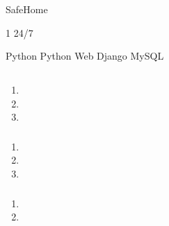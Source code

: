 \important{}

SafeHome

\important{}

1 24/7

\important{}

Python Python Web Django MySQL

\important{}

\important{}

\hypertarget{section-10}{%
\subsection{}\label{section-10}}

\hypertarget{section-11}{%
\subsubsection{}\label{section-11}}

\begin{enumerate}
\def\labelenumi{\arabic{enumi}.}
\tightlist
\item
\item
\item
\end{enumerate}

\hypertarget{section-12}{%
\subsubsection{}\label{section-12}}

\begin{enumerate}
\def\labelenumi{\arabic{enumi}.}
\tightlist
\item
\item
\item
\end{enumerate}

\hypertarget{section-13}{%
\subsubsection{}\label{section-13}}

\begin{enumerate}
\def\labelenumi{\arabic{enumi}.}
\tightlist
\item
\item
\end{enumerate}

\hypertarget{section-14}{%
\subsection{}\label{section-14}}

